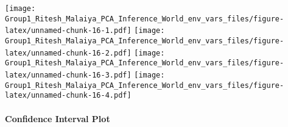 \documentclass[]{article}
\newenvironment{Shaded}{\begin{snugshade}}{\end{snugshade}}
\newcommand{\CommentTok}[1]{\textcolor[rgb]{0.56,0.35,0.01}{\textit{#1}}}
\newcommand{\ControlFlowTok}[1]{\textcolor[rgb]{0.13,0.29,0.53}{\textbf{#1}}}
\newcommand{\DataTypeTok}[1]{\textcolor[rgb]{0.13,0.29,0.53}{#1}}
\newcommand{\DecValTok}[1]{\textcolor[rgb]{0.00,0.00,0.81}{#1}}
\newcommand{\KeywordTok}[1]{\textcolor[rgb]{0.13,0.29,0.53}{\textbf{#1}}}
\newcommand{\NormalTok}[1]{#1}
\newcommand{\OperatorTok}[1]{\textcolor[rgb]{0.81,0.36,0.00}{\textbf{#1}}}
\newcommand{\StringTok}[1]{\textcolor[rgb]{0.31,0.60,0.02}{#1}}
\let\oldparagraph\paragraph
\renewcommand{\paragraph}[1]{\oldparagraph{#1}\mbox{}}
\begin{document}
\begin{Shaded}
\end{Shaded}

\texttt{[image: Group1\_Ritesh\_Malaiya\_PCA\_Inference\_World\_env\_vars\_files/figure-latex/unnamed-chunk-16-1.pdf]}
\texttt{[image: Group1\_Ritesh\_Malaiya\_PCA\_Inference\_World\_env\_vars\_files/figure-latex/unnamed-chunk-16-2.pdf]}
\texttt{[image: Group1\_Ritesh\_Malaiya\_PCA\_Inference\_World\_env\_vars\_files/figure-latex/unnamed-chunk-16-3.pdf]}
\texttt{[image: Group1\_Ritesh\_Malaiya\_PCA\_Inference\_World\_env\_vars\_files/figure-latex/unnamed-chunk-16-4.pdf]}

\hypertarget{confidence-interval-plot}{%
\paragraph{Confidence Interval Plot}\label{confidence-interval-plot}}
\end{document}
